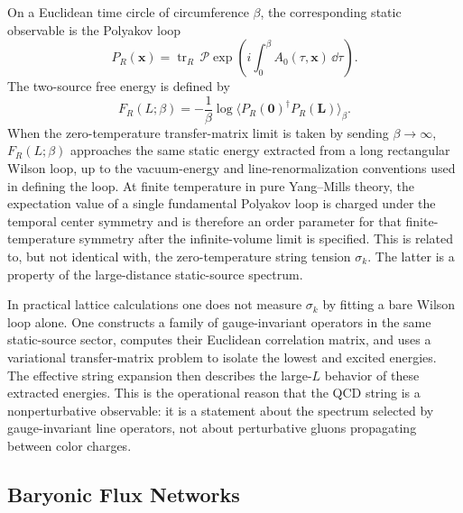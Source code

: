 On a Euclidean time circle of circumference \(\beta\), the corresponding
static observable is the Polyakov loop
\[
  P_R(\mathbf x)=
  \operatorname{tr}_R\,
  \mathcal P\exp\left(i\int_0^\beta A_0(\tau,\mathbf x)\,\dd\tau\right).
\]
The two-source free energy is defined by
\[
  F_R(L;\beta)
  =
  -\frac1\beta
  \log
  \langle P_R(\mathbf 0)^\dagger P_R(\mathbf L)\rangle_\beta .
\]
When the zero-temperature transfer-matrix limit is taken by sending
\(\beta\to\infty\), \(F_R(L;\beta)\) approaches the same static energy
extracted from a long rectangular Wilson loop, up to the vacuum-energy and
line-renormalization conventions used in defining the loop.  At finite
temperature in pure Yang--Mills theory, the expectation value of a single
fundamental Polyakov loop is charged under the temporal center symmetry and is
therefore an order parameter for that finite-temperature symmetry after the
infinite-volume limit is specified.  This is related to, but not identical
with, the zero-temperature string tension \(\sigma_k\).  The latter is a
property of the large-distance static-source spectrum.

In practical lattice calculations one does not measure
\(\sigma_k\) by fitting a bare Wilson loop alone.  One constructs a family of
gauge-invariant operators in the same static-source sector, computes their
Euclidean correlation matrix, and uses a variational transfer-matrix problem
to isolate the lowest and excited energies.  The effective string expansion
then describes the large-\(L\) behavior of these extracted energies.  This is
the operational reason that the QCD string is a nonperturbative observable:
it is a statement about the spectrum selected by gauge-invariant line
operators, not about perturbative gluons propagating between color charges.

\subsection{Baryonic Flux Networks}

